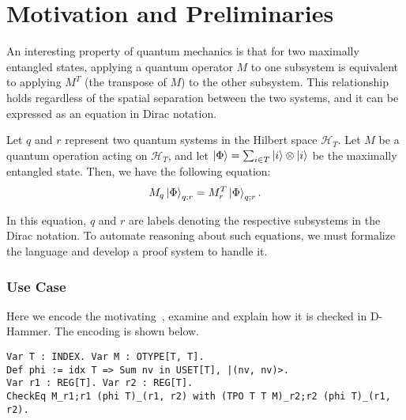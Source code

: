 


\section{Motivation and Preliminaries}

An interesting property of quantum mechanics is that for two maximally entangled states, applying a quantum operator \( M \) to one subsystem is equivalent to applying \( M^T \) (the transpose of \( M \)) to the other subsystem. This relationship holds regardless of the spatial separation between the two systems, and it can be expressed as an equation in Dirac notation.
\begin{example}
    \label{ex: motivating}
    Let \( q \) and \( r \) represent two quantum systems in the Hilbert space \( \mathcal{H}_T \). Let \( M \) be a quantum operation acting on \( \mathcal{H}_T \), and let \( \ket{\Phi} = \sum_{i \in T} \ket{i} \otimes \ket{i} \) be the maximally entangled state. Then, we have the following equation:
    \[
    M_q \ket{\Phi}_{q; r} = M_r^T \ket{\Phi}_{q; r}.
    \]
\end{example}

In this equation, \( q \) and \( r \) are labels denoting the respective subsystems in the Dirac notation. To automate reasoning about such equations, we must formalize the language and develop a proof system to handle it.



\subsubsection{Use Case}
Here we encode the motivating~, examine and explain how it is checked in D-Hammer. The encoding is shown below.

    \begin{lstlisting}[style=dhammer]
Var T : INDEX. Var M : OTYPE[T, T].
Def phi := idx T => Sum nv in USET[T], |(nv, nv)>.
Var r1 : REG[T]. Var r2 : REG[T].
CheckEq M_r1;r1 (phi T)_(r1, r2) with (TPO T T M)_r2;r2 (phi T)_(r1, r2).
    \end{lstlisting}        


